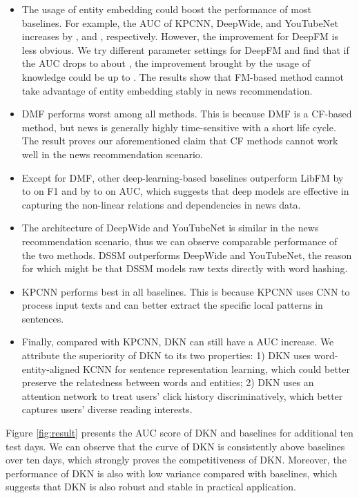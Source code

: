 \documentclass[sigconf]{acmart}
\begin{document}
			\begin{itemize}
				\item
					The usage of entity embedding could boost the performance of most baselines.
					For example, the AUC of KPCNN, DeepWide, and YouTubeNet increases by ,  and , respectively.
					However, the improvement for DeepFM is less obvious.
					We try different parameter settings for DeepFM and find that if the AUC drops to about , the improvement brought by the usage of knowledge could be up to .
					The results show that FM-based method cannot take advantage of entity embedding stably in news recommendation.
				\item
					DMF performs worst among all methods.
					This is because DMF is a CF-based method, but news is generally highly time-sensitive with a short life cycle.
					The result proves our aforementioned claim that CF methods cannot work well in the news recommendation scenario.
				\item
					Except for DMF, other deep-learning-based baselines outperform LibFM by  to  on F1 and by  to  on AUC, which suggests that deep models are effective in capturing the non-linear relations and dependencies in news data.
				\item
					The architecture of DeepWide and YouTubeNet is similar in the news recommendation scenario, thus we can observe comparable performance of the two methods.
					DSSM outperforms DeepWide and YouTubeNet, the reason for which might be that DSSM models raw texts directly with word hashing.
				\item
					KPCNN performs best in all baselines.
					This is because KPCNN uses CNN to process input texts and can better extract the specific local patterns in sentences.
				\item
					Finally, compared with KPCNN, DKN can still have a  AUC increase.
					We attribute the superiority of DKN to its two properties:
					1) DKN uses word-entity-aligned KCNN for sentence representation learning, which could better preserve the relatedness between words and entities;
					2) DKN uses an attention network to treat users' click history discriminatively, which better captures users' diverse reading interests.
			\end{itemize}
					
		Figure \ref{fig:result} presents the AUC score of DKN and baselines for additional ten test days.
		We can observe that the curve of DKN is consistently above baselines over ten days, which strongly proves the competitiveness of DKN.
		Moreover, the performance of DKN is also with low variance compared with baselines, which suggests that DKN is also robust and stable in practical application.
				
\end{document}
